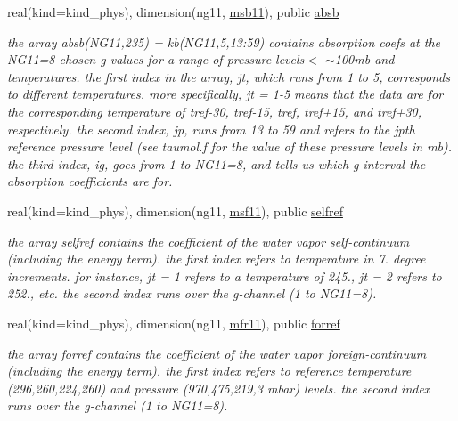 \begin{Indent}
\begin{DoxyCompactItemize}
real(kind=kind\+\_\+phys), dimension(ng11, \hyperlink{group__module__radlw__kgbnn_gaa8630868015cb7e358107e6418e35276}{msb11}), public \hyperlink{group__module__radlw__kgbnn_gacf37465675961812e07616e42b137d70}{absb}
\begin{DoxyCompactList}\small\item\em the array absb(\+N\+G11,235) = kb(\+N\+G11,5,13\+:59) contains absorption coefs at the N\+G11=8 chosen g-\/values for a range of pressure levels$<$ $\sim$100mb and temperatures. the first index in the array, jt, which runs from 1 to 5, corresponds to different temperatures. more specifically, jt = 1-\/5 means that the data are for the corresponding temperature of tref-\/30, tref-\/15, tref, tref+15, and tref+30, respectively. the second index, jp, runs from 13 to 59 and refers to the jpth reference pressure level (see taumol.\+f for the value of these pressure levels in mb). the third index, ig, goes from 1 to N\+G11=8, and tells us which g-\/interval the absorption coefficients are for. \end{DoxyCompactList}\item 
real(kind=kind\+\_\+phys), dimension(ng11, \hyperlink{group__module__radlw__kgbnn_ga7dcec9b9f19a3f5f13d443572d834628}{msf11}), public \hyperlink{group__module__radlw__kgbnn_gac98edefcce668d56c3aadc241863741f}{selfref}
\begin{DoxyCompactList}\small\item\em the array selfref contains the coefficient of the water vapor self-\/continuum (including the energy term). the first index refers to temperature in 7. degree increments. for instance, jt = 1 refers to a temperature of 245., jt = 2 refers to 252., etc. the second index runs over the g-\/channel (1 to N\+G11=8). \end{DoxyCompactList}\item 
real(kind=kind\+\_\+phys), dimension(ng11, \hyperlink{group__module__radlw__kgbnn_ga9b5764441999cce52bc02e65a24420b9}{mfr11}), public \hyperlink{group__module__radlw__kgbnn_ga9239d06fcd3fca0f13302c1ae4eb5a60}{forref}
\begin{DoxyCompactList}\small\item\em the array forref contains the coefficient of the water vapor foreign-\/continuum (including the energy term). the first index refers to reference temperature (296,260,224,260) and pressure (970,475,219,3 mbar) levels. the second index runs over the g-\/channel (1 to N\+G11=8). \end{DoxyCompactList}\item 

\end{DoxyCompactItemize}
\end{Indent}
